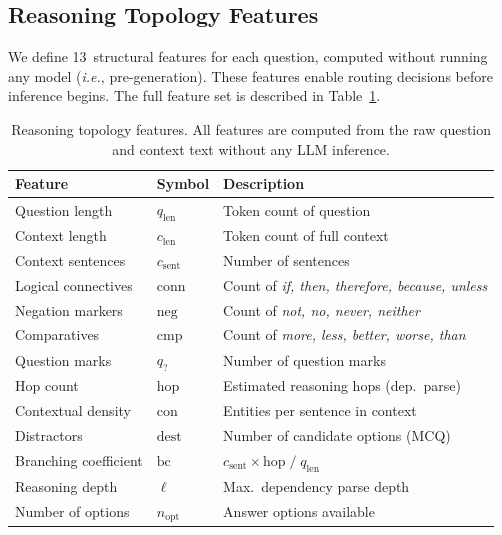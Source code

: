 \documentclass[11pt]{article}
\newcommand{\ie}{\emph{i.e.},\xspace}
\begin{document}
\subsection{Reasoning Topology Features}
\label{sec:features}

We define 13~structural features for each question, computed without running any model (\ie pre-generation). These features enable routing decisions before inference begins. The full feature set is described in Table~\ref{tab:features}.

\begin{table}[t]
\centering
\caption{Reasoning topology features. All features are computed from the raw question and context text without any LLM inference.}
\label{tab:features}
\small
\begin{tabular}{@{}llp{6cm}@{}}
\toprule
\textbf{Feature} & \textbf{Symbol} & \textbf{Description} \\
\midrule
Question length & $q_\text{len}$ & Token count of question \\
Context length & $c_\text{len}$ & Token count of full context \\
Context sentences & $c_\text{sent}$ & Number of sentences \\
Logical connectives & $\mathrm{conn}$ & Count of \emph{if, then, therefore, because, unless} \\
Negation markers & $\mathrm{neg}$ & Count of \emph{not, no, never, neither} \\
Comparatives & $\mathrm{cmp}$ & Count of \emph{more, less, better, worse, than} \\
Question marks & $q_?$ & Number of question marks \\
Hop count & $\mathrm{hop}$ & Estimated reasoning hops (dep.\ parse) \\
Contextual density & $\mathrm{con}$ & Entities per sentence in context \\
Distractors & $\mathrm{dest}$ & Number of candidate options (MCQ) \\
Branching coefficient & $\mathrm{bc}$ & $c_\text{sent} \times \mathrm{hop} \;/\; q_\text{len}$ \\
Reasoning depth & $\ell$ & Max.\ dependency parse depth \\
Number of options & $n_\text{opt}$ & Answer options available \\
\bottomrule
\end{tabular}
\end{table}

\end{document}
